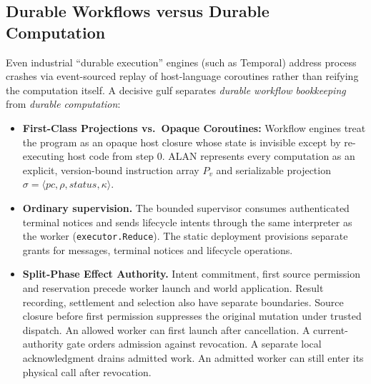 \documentclass[11pt,a4paper]{article}
\theoremstyle{definition}
\theoremstyle{remark}
\begin{document}
\subsection{Durable Workflows versus Durable Computation}
Even industrial ``durable execution'' engines (such as Temporal) address process crashes via event-sourced replay of host-language coroutines rather than reifying the computation itself. A decisive gulf separates \emph{durable workflow bookkeeping} from \emph{durable computation}:
\begin{itemize}
  \item \textbf{First-Class Projections vs.\ Opaque Coroutines:} Workflow engines treat the program as an opaque host closure whose state is invisible except by re-executing host code from step $0$. ALAN represents every computation as an explicit, version-bound instruction array $P_v$ and serializable projection $\sigma = \langle \mathit{pc}, \rho, \mathit{status}, \kappa \rangle$.
  \item \textbf{Ordinary supervision.} The bounded supervisor consumes authenticated terminal notices and sends lifecycle intents through the same interpreter as the worker (\texttt{executor.Reduce}). The static deployment provisions separate grants for messages, terminal notices and lifecycle operations.
  \item \textbf{Split-Phase Effect Authority.} Intent commitment, first source permission and reservation precede worker launch and world application. Result recording, settlement and selection also have separate boundaries. Source closure before first permission suppresses the original mutation under trusted dispatch. An allowed worker can first launch after cancellation. A current-authority gate orders admission against revocation. A separate local acknowledgment drains admitted work. An admitted worker can still enter its physical call after revocation.
\end{itemize}
\end{document}
